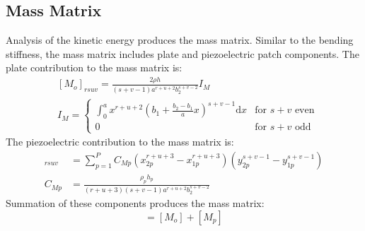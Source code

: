 \documentclass[thesis]{fputhesis}
\begin{document}
\begin{body}
\subsection{Mass Matrix}
Analysis of the kinetic energy produces the mass matrix. Similar to the bending stiffness, the mass matrix includes plate and piezoelectric patch components. The plate contribution to the mass matrix is:
\begin{align}\label{Mass}
&[M_o]_{rsuv} = \frac{2\rho h}{(s+v-1)a^{r+u+2}b_2^{s+v-2}}I_M \\
&I_M = 
\begin{cases}
\int_0^a x^{r+u+2}(b_1+\frac{b_2-b_1}{a}x)^{s+v-1} \text{d}x & \text{for } s+v \text{ even} \\
0 & \text{for } s+v \text{ odd}
\end{cases}
\end{align}
The piezoelectric contribution to the mass matrix is:
\begin{align}
[M_p]_{rsuv}&=\sum_{p=1}^P C_{Mp} (x_{2p}^{r+u+3}-x_{1p}^{r+u+3})(y_{2p}^{s+v-1}-y_{1p}^{s+v-1}) \\
C_{Mp}&=\frac{\rho_p h_p}{(r+u+3)(s+v-1)a^{r+u+2}b_2^{s+v-2}}
\end{align}
Summation of these components produces the mass matrix:
\begin{equation}
[M]=[M_o]+[M_p]
\end{equation}







\end{body}
\end{document}
